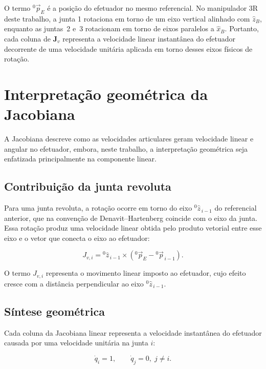 O termo ${}^{0}\!\vec p_{E}$ é a posição do efetuador no mesmo referencial.
No manipulador 3R deste trabalho, a junta 1 rotaciona em torno de um eixo vertical alinhado com $\hat{z}_{B}$, enquanto as juntas~2 e~3 rotacionam em torno de eixos paralelos a $\hat{x}_{B}$. 
Portanto, cada coluna de $\mathbf{J}_{v}$ representa a velocidade linear instantânea do efetuador decorrente de uma velocidade unitária aplicada em torno desses eixos físicos de rotação.

\section{Interpretação geométrica da Jacobiana}
\label{sec_interpretacao_geometrica_jacobiana}

A Jacobiana descreve como as velocidades articulares geram velocidade linear e angular no efetuador, embora, neste trabalho, a interpretação geométrica seja enfatizada principalmente na componente linear.

\subsection{Contribuição da junta revoluta}

Para uma junta revoluta, a rotação ocorre em torno do eixo ${}^{0}\!\hat{z}_{\,i-1}$ do referencial anterior, que na convenção de Denavit--Hartenberg coincide com o eixo da junta.
Essa rotação produz uma velocidade linear obtida pelo produto vetorial entre esse eixo e o vetor que conecta o eixo ao efetuador:

\begin{equation}
J_{v,i}
=
{}^{0}\!\hat{z}_{\,i-1}
\times
\left(
{}^{0}\!\vec{p}_{E}
-
{}^{0}\!\vec{p}_{\,i-1}
\right).
\end{equation}

O termo $J_{v,i}$ representa o movimento linear imposto ao efetuador, cujo efeito cresce com a distância perpendicular ao eixo ${}^{0}\!\hat{z}_{\,i-1}$.

\subsection{Síntese geométrica}

Cada coluna da Jacobiana linear representa a velocidade instantânea do efetuador causada por uma velocidade unitária na junta $i$:

\begin{equation}
\dot{q}_{i} = 1,
\qquad
\dot{q}_{j} = 0,\; j \neq i.
\end{equation}

